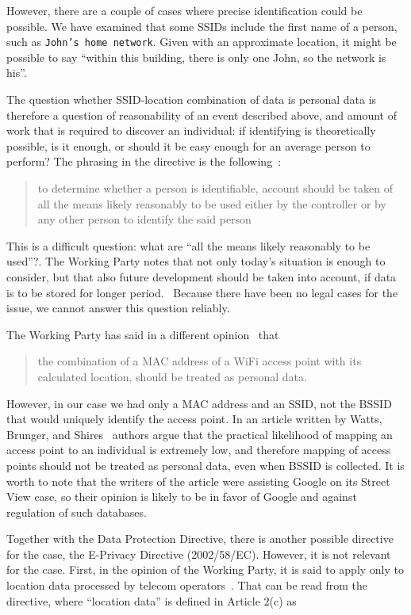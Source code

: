 \documentclass[12pt,a4paper,oneside,pdftex]{report}
\begin{document}
However, there are a couple of cases where precise identification could be possible. We have examined that some SSIDs include the first name of a person, such as \texttt{John's home network}. Given with an approximate location, it might be possible to say ``within this building, there is only one John, so the network is his''. 

The question whether SSID-location combination of data is personal data is therefore a question of reasonability of an event described above, and amount of work that is required to discover an individual: if identifying is theoretically possible, is it enough, or should it be easy enough for an average person to perform? The phrasing in the directive is the following~\cite{data_protection}:

\begin{quote}
    to determine whether a person is identifiable, account should be taken of all the means likely reasonably to be used either by the controller or by any other person to identify the said person
\end{quote}

This is a difficult question: what are ``all the means likely reasonably to be used''?. The Working Party notes that not only today's situation is enough to consider, but that also future development should be taken into account, if data is to be stored for longer period.~\cite{wp29_136} Because there have been no legal cases for the issue, we cannot answer this question reliably.

The Working Party has said in a different opinion~\cite{wp29_185} that 
\begin{quote}
    the combination of a MAC address of a WiFi access point with its calculated location, should be treated as personal data.
\end{quote}

However, in our case we had only a MAC address and an SSID, not the BSSID that would uniquely identify the access point. In an article written by Watts, Brunger, and Shires~\cite{watts2011european} authors argue that the practical likelihood of mapping an access point to an individual is extremely low, and therefore mapping of access points should not be treated as personal data, even when BSSID is collected. It is worth to note that the writers of the article were assisting Google on its Street View case, so their opinion is likely to be in favor of Google and against regulation of such databases.

Together with the Data Protection Directive, there is another possible directive for the case, the E-Privacy Directive (2002/58/EC). However, it is not relevant for the case. First, in the opinion of the Working Party, it is said to apply only to location data processed by telecom operators~\cite{wp29_185}. That can be read from the directive, where ``location data'' is defined in Article 2(c) as
\end{document}
